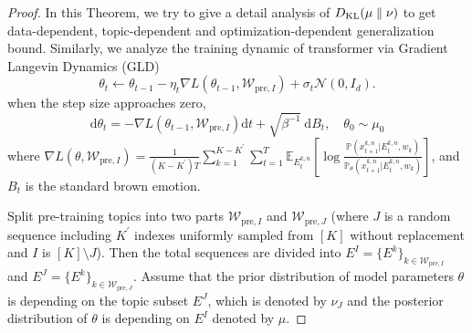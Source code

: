\begin{proof}
	In this Theorem, we try to give a detail analysis of $D_{\mathrm{KL}}(\mu \parallel \nu)$ to get data-dependent, topic-dependent and optimization-dependent generalization bound. Similarly, we analyze the training dynamic of transformer via Gradient Langevin Dynamics (GLD)
	$$
	\theta_t \leftarrow {\theta}_{t-1} - \eta_t \nabla L(\theta_{t-1}, \mathcal{W}_{\text{pre},I})+\sigma_t\mathcal{N}(0,I_d).
	$$
	when the step size approaches zero,
	$$
	\mathrm{d} \theta_t=- \nabla L(\theta_{t-1}, \mathcal{W}_{\text{pre},I})\mathrm{d} t+\sqrt{ \beta^{-1}} \mathrm{~d} B_t, \quad \theta_0 \sim \mu_0
	$$
	where $\nabla L(\theta, \mathcal{W}_{\text{pre},I})=\frac{1}{(K-K^{\prime})T}\sum_{k=1}^{K-K^{\prime}}\sum_{t=1}^T\mathbb{E}_{E^{k,n}_t} [\log \frac{\mathbb{P}(x^{k,n}_{t+1}|E^{k,n}_t, w_k)}{\mathbb{P}_\theta(x^{k,n}_{t+1}|E^{k,n}_t, w_k)}]$, and $B_t$ is the standard brown emotion.
	
	Split pre-training topics into two parts $\mathcal{W}_{\text{pre},I}$ and $\mathcal{W}_{\text{pre},J}$ (where $J$ is a random sequence including $K^{\prime}$ indexes uniformly sampled from $[K]$ without replacement and $I$ is $[K]\setminus J$). Then the total sequences are divided into $E^I=\{E^k\}_{k \in \mathcal{W}_{\text{pre},I}}$ and $E^J=\{E^k\}_{k \in \mathcal{W}_{\text{pre},J}}$. Assume that the prior distribution of model parameters $\theta$ is depending on the topic subset $E^J$, which is denoted by $\nu_J$ and the posterior distribution of $\theta$ is depending on $E^I$ denoted by $\mu$.
	

\end{proof}
